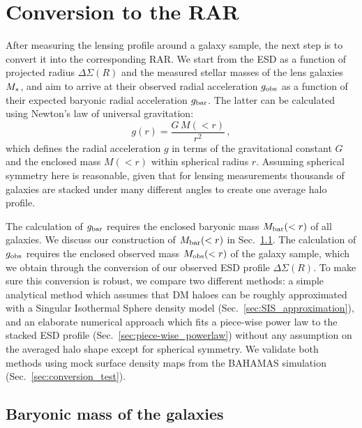 \documentclass[usenatbib]{mnras}
\newcommand{\un}[1]{_{\rm #1}}
\begin{document}
\section{Conversion to the RAR}
\label{sec:conversion}

After measuring the lensing profile around a galaxy sample, the next step is to convert it into the corresponding RAR. We start from the ESD as a function of projected radius $\Delta\Sigma(R)$ and the measured stellar masses of the lens galaxies $M\un{*}$, and aim to arrive at their observed radial acceleration $g\un{obs}$ as a function of their expected baryonic radial acceleration $g\un{bar}$. The latter can be calculated using Newton's law of universal gravitation:
\begin{equation}\label{eq:grav}
g(r) = \frac{G \, M(<r)}{r^2} \, ,
\end{equation}
which defines the radial acceleration $g$ in terms of the gravitational constant $G$ and the enclosed mass $M(<r)$ within spherical radius $r$. Assuming spherical symmetry here is reasonable, given that for lensing measurements thousands of galaxies are stacked under many different angles to create one average halo profile. 

The calculation of $g\un{bar}$ requires the enclosed baryonic mass $M\un{bar}(<r)$ of all galaxies. We discuss our construction of $M\un{bar}(<r)$ in Sec.~\ref{sec:baryonic_mass}. The calculation of $g\un{obs}$ requires the enclosed observed mass $M\un{obs}(<r)$ of the galaxy sample, which we obtain through the conversion of our observed ESD profile \mbox{$\Delta\Sigma(R)$}. To make sure this conversion is robust, we compare two different methods: a simple analytical method which assumes that DM haloes can be roughly approximated with a Singular Isothermal Sphere density model (Sec.~\ref{sec:SIS_approximation}), and an elaborate numerical approach which fits a piece-wise power law to the stacked ESD profile (Sec.~\ref{sec:piece-wise_powerlaw}) without any assumption on the averaged halo shape except for spherical symmetry. We validate both methods using mock surface density maps from the BAHAMAS simulation (Sec.~\ref{sec:conversion_test}).

\subsection{Baryonic mass of the galaxies}
\label{sec:baryonic_mass}
\end{document}
